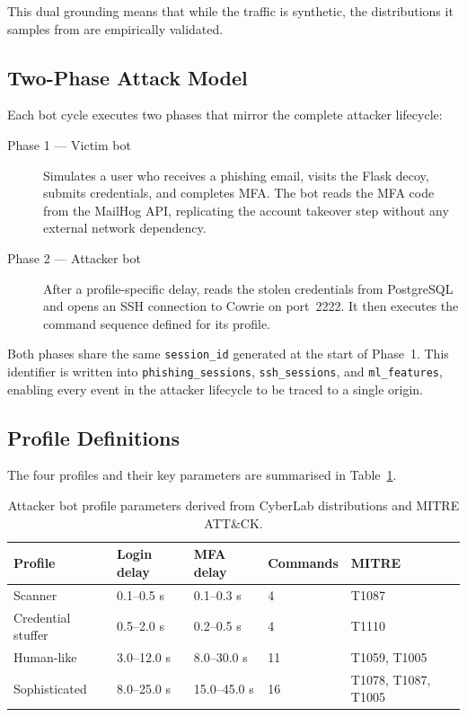 This dual grounding means that while the traffic is synthetic, the distributions
it samples from are empirically validated.

\subsection{Two-Phase Attack Model}

Each bot cycle executes two phases that mirror the complete attacker lifecycle:

\begin{description}
    \item[Phase 1 — Victim bot] Simulates a user who receives a phishing email,
    visits the Flask decoy, submits credentials, and completes MFA\@. The bot
    reads the MFA code from the MailHog API, replicating the account takeover
    step without any external network dependency.

    \item[Phase 2 — Attacker bot] After a profile-specific delay, reads the
    stolen credentials from PostgreSQL and opens an SSH connection to Cowrie on
    port~2222. It then executes the command sequence defined for its profile.
\end{description}

Both phases share the same \texttt{session\_id} generated at the start of
Phase~1. This identifier is written into \texttt{phishing\_sessions},
\texttt{ssh\_sessions}, and \texttt{ml\_features}, enabling every event in the
attacker lifecycle to be traced to a single origin.

\subsection{Profile Definitions}

The four profiles and their key parameters are summarised in
Table~\ref{tab:bot_profiles}.

\begin{table}[h]
\centering
\caption{Attacker bot profile parameters derived from CyberLab distributions and MITRE ATT\&CK.}
\label{tab:bot_profiles}
\begin{tabular}{lllll}
\hline
\textbf{Profile} & \textbf{Login delay} & \textbf{MFA delay} & \textbf{Commands} & \textbf{MITRE} \\
\hline
Scanner            & 0.1–0.5 s  & 0.1–0.3 s   & 4  & T1087 \\
Credential stuffer & 0.5–2.0 s  & 0.2–0.5 s   & 4  & T1110 \\
Human-like         & 3.0–12.0 s & 8.0–30.0 s  & 11 & T1059, T1005 \\
Sophisticated      & 8.0–25.0 s & 15.0–45.0 s & 16 & T1078, T1087, T1005 \\
\hline
\end{tabular}
\end{table}

